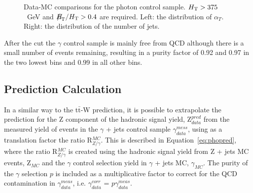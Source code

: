 \begin{figure}[h]
\begin{center}
\caption{\label{fig:photon_plots} Data-MC comparisons for the photon control sample.  $\mbox{$H_\text{T}$} > 375$~GeV and $\mht/\scalht>0.4$ are required.   Left: the distribution of $\alpha_{T}$.  Right: the distribution of the number of jets.}
\end{center}
\end{figure}

After the \alt cut the $\gamma$ control sample is mainly free from QCD although there is a small number of events remaining, resulting in a purity factor of 0.92 and 0.97 in the two lowest bins and 0.99 in all other bins. 

\subsection{Prediction Calculation}

In a similar way to the t$\bar{\textrm{t}}$-W prediction, it is possible to extrapolate the prediction for the Z component of the hadronic signal yield, Z$^{pred}_{data}$ from the measured  yield of events in the $\gamma$ + jets control sample $\gamma^{mess}_{data}$, using as a translation factor the ratio R$^{MC}_{Z/\gamma}$. This is described in Equation~\ref{eq:phopred}, where the ratio R$^{MC}_{Z/\gamma}$ is created using the hadronic signal yield from Z + jets MC events, Z$_{MC}$ and the $\gamma$ control selection yield in $\gamma$ + jets MC, $\gamma_{MC}$. The purity of the $\gamma$ selection $p$ is included as a multiplicative factor to correct for the QCD contamination in $\gamma^{meas}_{data}$, i.e. $\gamma^{corr}_{data}$ = $p \gamma^{meas}_{data}$.


